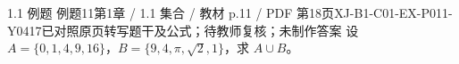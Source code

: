 \par\noindent\begin{minipage}{\linewidth}
\begin{bankitem}{1.1 例题 例题11}{第1章 / 1.1 集合 / 教材 p.11 / PDF 第18页}{XJ-B1-C01-EX-P011-Y0417}{已对照原页转写题干及公式；待教师复核；未制作答案}
设 $A=\{0,1,4,9,16\}$，$B=\{9,4,\pi,\sqrt2,1\}$，求 $A\cup B$。
\end{bankitem}
\end{minipage}\par\medskip
